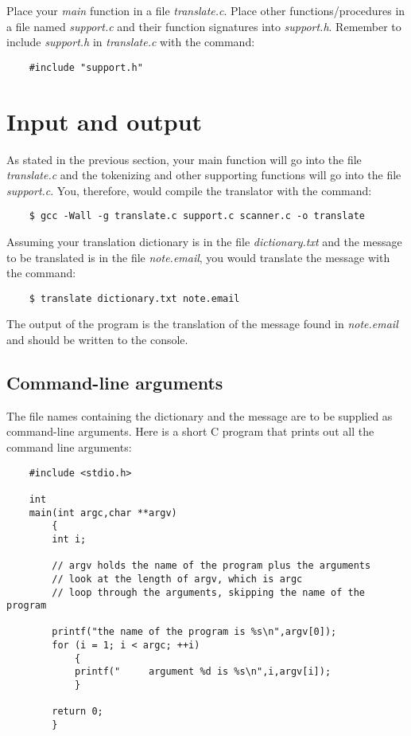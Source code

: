 \documentclass[12pt]{article}
\begin{document}
Place your {\it main} function in a 
file {\it translate.c}. Place other functions/procedures
in a file named
{\it support.c}  and their function signatures into {\it support.h}.
Remember to include {\it support.h} in {\it translate.c}
with the command:

\begin{verbatim}
    #include "support.h"
\end{verbatim}

\section*{Input and output}

As stated in the previous section,
your main function will go into the file {\it translate.c} and
the tokenizing and other supporting functions will go into
the file {\it support.c}.
You, therefore, would compile the translator with the command:

\begin{verbatim}
    $ gcc -Wall -g translate.c support.c scanner.c -o translate 
\end{verbatim}

Assuming your translation dictionary is in the file
{\it dictionary.txt}
and the message to be translated is in the file
{\it note.email},
you would translate the message with the command:

\begin{verbatim}
    $ translate dictionary.txt note.email
\end{verbatim}

The output of the program is the translation of the message
found in {\it note.email} and should be written to the console.

\subsection*{Command-line arguments}

The file names containing the dictionary and the message are
to be supplied as command-line arguments.
Here is a short C program that prints out all the command
line arguments:

\begin{verbatim}
    #include <stdio.h>

    int
    main(int argc,char **argv)
        {
        int i;

        // argv holds the name of the program plus the arguments
        // look at the length of argv, which is argc
        // loop through the arguments, skipping the name of the program

        printf("the name of the program is %s\n",argv[0]);
        for (i = 1; i < argc; ++i)
            {
            printf("     argument %d is %s\n",i,argv[i]);
            }

        return 0;
        }
\end{verbatim}
\end{document}
